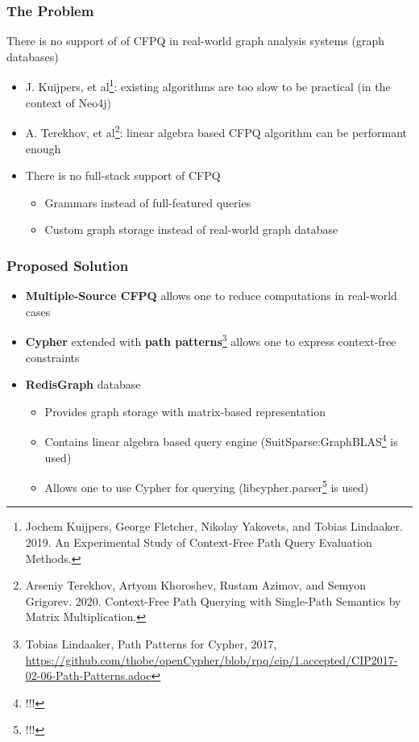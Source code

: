 \documentclass[xcolor=table,aspectratio=169]{beamer}
\begin{document}
\begin{frame}[fragile] \frametitle{The Problem}
   There is no support of of CFPQ in real-world graph analysis systems (graph databases)
\pause
   \begin{itemize}     
      \item J. Kuijpers, et al\footnote{Jochem Kuijpers, George Fletcher, Nikolay Yakovets, and Tobias Lindaaker. 2019. An Experimental Study of Context-Free Path Query Evaluation Methods.}: existing algorithms are too slow to be practical (in the context of Neo4j)
      \pause    
      \item A. Terekhov, et al\footnote{Arseniy Terekhov, Artyom Khoroshev, Rustam Azimov, and Semyon Grigorev. 2020. Context-Free Path Querying with Single-Path Semantics by Matrix Multiplication.}: linear algebra based CFPQ algorithm can be performant enough
      \pause
      \item There is no full-stack support of CFPQ
      \begin{itemize}
        \item Grammars instead of full-featured queries
        \item Custom graph storage instead of real-world graph database        
      \end{itemize}
    \end{itemize}
  
\end{frame}


\begin{frame}[fragile] \frametitle{Proposed Solution}
  \begin{itemize}
      \item \textbf{Multiple-Source CFPQ} allows one to reduce computations in real-world cases
      \pause
      \item \textbf{Cypher} extended with \textbf{path patterns}\footnote{Tobias Lindaaker, Path Patterns for Cypher, 2017, \scriptsize \url{https://github.com/thobe/openCypher/blob/rpq/cip/1.accepted/CIP2017-02-06-Path-Patterns.adoc}} allows one to express context-free constraints 
      \pause
      \item \textbf{RedisGraph} database 
      \begin{itemize}
        \item Provides graph storage with matrix-based representation
        \item Contains linear algebra based query engine (SuitSparse:GraphBLAS\footnote{!!!} is used)
        \item Allows one to use Cypher for querying (libcypher.parser\footnote{!!!} is used)
      \end{itemize}
      
      
  \end{itemize}
  
\end{frame}
\end{document}
